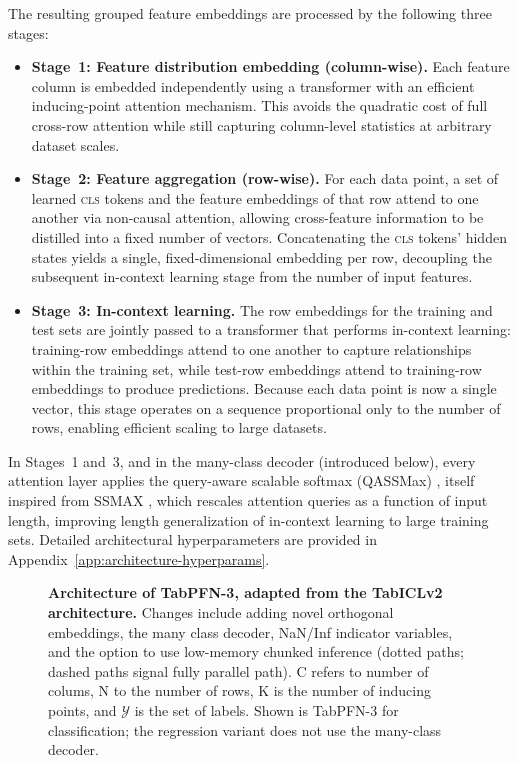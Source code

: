 The resulting grouped feature embeddings are processed by the following three stages:

\begin{itemize}
    \item \textbf{Stage~1: Feature distribution embedding (column-wise).}
    Each feature column is embedded independently using a transformer with an efficient inducing-point attention mechanism.
    This avoids the quadratic cost of full cross-row attention while still capturing column-level statistics at arbitrary dataset scales.

    \item \textbf{Stage~2: Feature aggregation (row-wise).}
    For each data point, a set of learned \textsc{cls} tokens and the feature embeddings of that row attend to one another via non-causal attention, allowing cross-feature information to be distilled into a fixed number of vectors.
    Concatenating the \textsc{cls} tokens' hidden states yields a single, fixed-dimensional embedding per row, decoupling the subsequent in-context learning stage from the number of input features.

    \item \textbf{Stage~3: In-context learning.}
    The row embeddings for the training and test sets are jointly passed to a transformer that performs in-context learning: training-row embeddings attend to one another to capture relationships within the training set, while test-row embeddings attend to training-row embeddings to produce predictions.
    Because each data point is now a single vector, this stage operates on a sequence proportional only to the number of rows, enabling efficient scaling to large datasets.
\end{itemize}


In Stages~1 and~3, and in the many-class decoder (introduced below), every attention layer applies the query-aware scalable softmax (QASSMax) \citep{qu2026tabiclv2}, itself inspired from SSMAX \citep{ssmax_vanilla}, which rescales attention queries as a function of input length, improving  length generalization of in-context learning to large training sets.
Detailed architectural hyperparameters are provided in Appendix~\ref{app:architecture-hyperparams}.

\begin{figure}[!t]
    \centering
    \caption{\textbf{Architecture of TabPFN-3, adapted from the TabICLv2 architecture.} Changes include adding novel orthogonal embeddings, the many class decoder, NaN/Inf indicator variables, and the option to use low-memory chunked inference (dotted paths; dashed paths signal fully parallel path). C refers to number of colums, N to the number of rows, K is the number of inducing points, and $\mathcal{Y}$ is the set of labels. Shown is TabPFN-3 for classification; the regression variant does not use the many-class decoder.
    }
    \label{fig:arch_diagram}
\end{figure}






